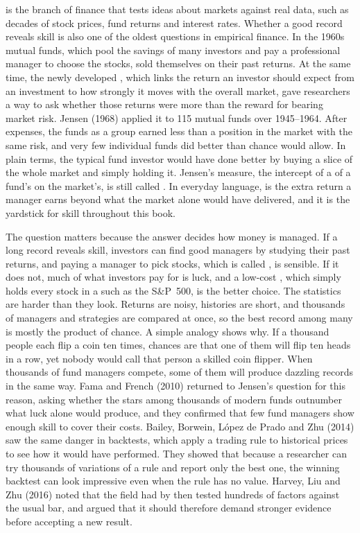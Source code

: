  is the branch of finance that tests ideas about markets against real data, such as decades of stock prices, fund returns and interest rates.
Whether a good record reveals skill is also one of the oldest questions in empirical finance. In the 1960s mutual funds, which pool the savings of many investors and pay a professional manager to choose the stocks, sold themselves on their past returns. At the same time, the newly developed , which links the return an investor should expect from an investment to how strongly it moves with the overall market, gave researchers a way to ask whether those returns were more than the reward for bearing market risk. Jensen (1968) applied it to 115 mutual funds over 1945--1964. After expenses, the funds as a group earned less than a  position in the market with the same risk, and very few individual funds did better than chance would allow. In plain terms, the typical fund investor would have done better by buying a slice of the whole market and simply holding it. Jensen's measure, the intercept of a  of a fund's  on the market's, is still called . In everyday language,  is the extra return a manager earns beyond what the market alone would have delivered, and it is the yardstick for skill throughout this book.

The question matters because the answer decides how money is managed. If a long record reveals skill, investors can find good managers by studying their past returns, and paying a manager to pick stocks, which is called , is sensible. If it does not, much of what investors pay for is luck, and a low-cost , which simply holds every stock in a  such as the S\&P~500, is the better choice. The statistics are harder than they look. Returns are noisy, histories are short, and thousands of managers and strategies are compared at once, so the best record among many is mostly the product of chance. A simple analogy shows why. If a thousand people each flip a coin ten times, chances are that one of them will flip ten heads in a row, yet nobody would call that person a skilled coin flipper. When thousands of fund managers compete, some of them will produce dazzling records in the same way. Fama and French (2010) returned to Jensen's question for this reason, asking whether the stars among thousands of modern funds outnumber what luck alone would produce, and they confirmed that few fund managers show enough skill to cover their costs. Bailey, Borwein, L\'opez de Prado and Zhu (2014) saw the same danger in backtests, which apply a trading rule to historical prices to see how it would have performed. They showed that because a researcher can try thousands of variations of a rule and report only the best one, the winning backtest can look impressive even when the rule has no value. Harvey, Liu and Zhu (2016) noted that the field had by then tested hundreds of factors against the usual bar, and argued that it should therefore demand stronger evidence before accepting a new result.

